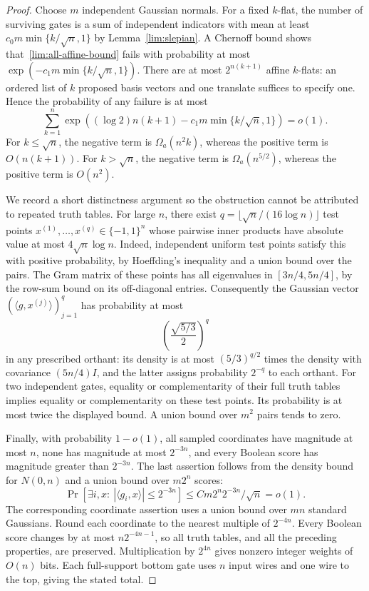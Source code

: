 \documentclass[11pt,letterpaper]{article}
\theoremstyle{definition}
\theoremstyle{remark}
\begin{document}
\begin{proof}
Choose $m$ independent Gaussian normals.  For a fixed $k$-flat, the number
of surviving gates is a sum of independent indicators with mean at least
$c_0m\min\{k/\sqrt n,1\}$ by Lemma~\ref{lim:slepian}.  A Chernoff bound
shows that~\eqref{lim:all-affine-bound} fails with probability at most
$\exp(-c_1m\min\{k/\sqrt n,1\})$.  There are at most $2^{n(k+1)}$
affine $k$-flats: an ordered list of $k$ proposed basis vectors and one
translate suffices to specify one.  Hence the probability of any failure
is at most
\[
 \sum_{k=1}^n
 \exp\left((\log 2)n(k+1)
              -c_1m\min\{k/\sqrt n,1\}\right)=o(1).
\]
For $k\le\sqrt n$, the negative term is $\Omega_a(n^2k)$, whereas the
positive term is $O(n(k+1))$.  For $k>\sqrt n$, the negative term is
$\Omega_a(n^{5/2})$, whereas the positive term is $O(n^2)$.

We record a short distinctness argument so the obstruction cannot be
attributed to repeated truth tables.  For large $n$, there exist
$q=\lfloor\sqrt n/(16\log n)\rfloor$ test points
$x^{(1)},\ldots,x^{(q)}\in\{-1,1\}^n$ whose pairwise inner products have
absolute value at most $4\sqrt n\log n$.  Indeed, independent uniform
test points satisfy this with positive probability, by Hoeffding's
inequality and a union bound over the pairs.  The Gram matrix of these
points has all eigenvalues in $[3n/4,5n/4]$, by the row-sum bound on its
off-diagonal entries.  Consequently the Gaussian vector
$(\langle g,x^{(j)}\rangle)_{j=1}^q$ has probability at most
\[
 \left(\frac{\sqrt{5/3}}{2}\right)^q
\]
in any prescribed orthant: its density is at most $(5/3)^{q/2}$ times
the density with covariance $(5n/4)I$, and the latter assigns probability
$2^{-q}$ to each orthant.  For two independent gates, equality or
complementarity of their full truth tables implies equality or
complementarity on these test points.  Its probability is at most twice
the displayed bound.  A union bound over $m^2$ pairs tends to zero.

Finally, with probability $1-o(1)$, all sampled coordinates have magnitude
at most $n$, none has magnitude at most $2^{-3n}$, and every Boolean score
has magnitude greater than $2^{-3n}$.  The last assertion follows from
the density bound for $N(0,n)$ and a union bound over $m2^n$ scores:
\[
 \Pr[\exists i,x:\ |\langle g_i,x\rangle|\le2^{-3n}]
 \le C m2^n2^{-3n}/\sqrt n=o(1).
\]
The corresponding coordinate assertion uses a union bound over $mn$
standard Gaussians.  Round each coordinate to the nearest multiple of
$2^{-4n}$.  Every Boolean score changes by at most $n2^{-4n-1}$, so all
truth tables, and all the preceding properties, are preserved.
Multiplication by $2^{4n}$ gives nonzero integer weights of $O(n)$ bits.
Each full-support bottom gate uses $n$ input wires and one wire to the top,
giving the stated total.
\end{proof}
\end{document}
